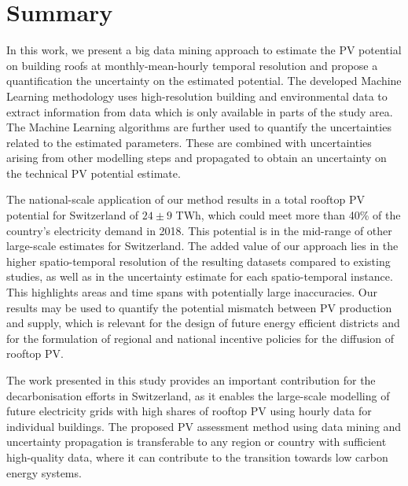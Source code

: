 
\section{Summary}
\label{solar_conclusion}

In this work, we present a big data mining approach to estimate the PV potential on building roofs at monthly-mean-hourly temporal resolution and propose a quantification the uncertainty on the estimated potential. 
The developed Machine Learning methodology uses high-resolution building and environmental data to extract information from data which is only available in parts of the study area.
%
The Machine Learning algorithms are further used to quantify the uncertainties related to the estimated parameters. These are combined with uncertainties arising from other modelling steps and propagated to obtain an uncertainty on the technical PV potential estimate. 

The national-scale application of our method results in a total rooftop PV potential for Switzerland of $24\pm9$ TWh, which could meet more than 40\% of the country's electricity demand in 2018. 
This potential is in the mid-range of other large-scale estimates for Switzerland.
The added value of our approach lies in the higher spatio-temporal resolution of the resulting datasets compared to existing studies, as well as in the uncertainty estimate for each spatio-temporal instance.
This highlights areas and time spans with potentially large inaccuracies. 
Our results may be used to quantify the potential mismatch between PV production and supply, which is relevant for the design of future energy efficient districts and for the formulation of regional and national incentive policies for the diffusion of rooftop PV.

The work presented in this study provides an important contribution for the decarbonisation efforts in Switzerland, as it enables the large-scale modelling of future electricity grids with high shares of rooftop PV using hourly data for individual buildings. The proposed PV assessment method using data mining and uncertainty propagation is transferable to any region or country with sufficient high-quality data, where it can contribute to the transition towards low carbon energy systems.

